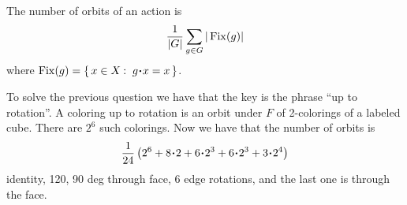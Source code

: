 \documentclass[12pt]{memoir}
\begin{document}
\begin{Lem}
    The number of orbits of an action is 
    $$\frac{1}{|G|}\sum_{g\in G}|\operatorname{Fix}(g)|$$
    where $\Fix(g)=\set{x\in X\:\ g\.x=x}$.
\end{Lem}

To solve the previous question we have that the key is the phrase ``up to rotation''. A coloring up to rotation is an orbit under $F$ of 2-colorings of a labeled cube. There are $2^6$ such colorings. Now we have that the number of orbits is 
$$\frac{1}{24}\left(2^6+8\.2+6\.2^3+6\.2^3+3\.2^4\right)$$
identity, 120, 90 deg through face, 6 edge rotations, and the last one is through the face.
\ifx\nextra\undefined
\printindex
\else\fi
\nocite{*}


\end{document}
